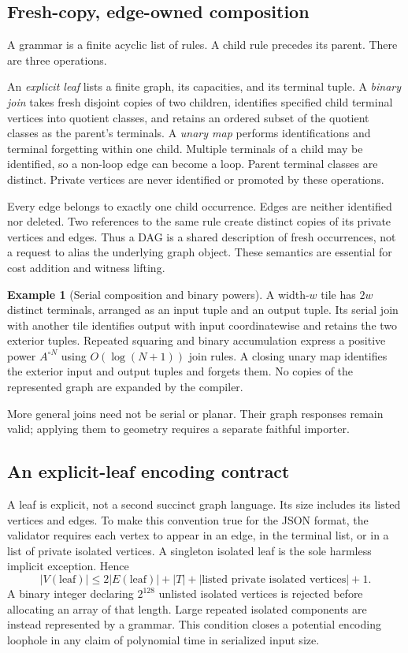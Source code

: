 \documentclass[11pt,a4paper]{article}
\theoremstyle{definition}
\newtheorem{example}[theorem]{Example}
\theoremstyle{remark}
\begin{document}
\subsection{Fresh-copy, edge-owned composition}
A grammar is a finite acyclic list of rules. A child rule precedes its parent. There are three operations.

An \emph{explicit leaf} lists a finite graph, its capacities, and its terminal tuple. A \emph{binary join} takes fresh disjoint copies of two children, identifies specified child terminal vertices into quotient classes, and retains an ordered subset of the quotient classes as the parent's terminals. A \emph{unary map} performs identifications and terminal forgetting within one child. Multiple terminals of a child may be identified, so a non-loop edge can become a loop. Parent terminal classes are distinct. Private vertices are never identified or promoted by these operations.

Every edge belongs to exactly one child occurrence. Edges are neither identified nor deleted. Two references to the same rule create distinct copies of its private vertices and edges. Thus a DAG is a shared description of fresh occurrences, not a request to alias the underlying graph object. These semantics are essential for cost addition and witness lifting.

\begin{example}[Serial composition and binary powers]
A width-$w$ tile has $2w$ distinct terminals, arranged as an input tuple and an output tuple. Its serial join with another tile identifies output with input coordinatewise and retains the two exterior tuples. Repeated squaring and binary accumulation express a positive power $A^{\circ N}$ using $O(\log(N+1))$ join rules. A closing unary map identifies the exterior input and output tuples and forgets them. No copies of the represented graph are expanded by the compiler.
\end{example}
More general joins need not be serial or planar. Their graph responses remain valid; applying them to geometry requires a separate faithful importer.

\subsection{An explicit-leaf encoding contract}
A leaf is explicit, not a second succinct graph language. Its size includes its listed vertices and edges. To make this convention true for the JSON format, the validator requires each vertex to appear in an edge, in the terminal list, or in a list of private isolated vertices. A singleton isolated leaf is the sole harmless implicit exception. Hence
\[
 |V(\text{leaf})|\le 2|E(\text{leaf})|+|T|+
 |\text{listed private isolated vertices}|+1.
\]
A binary integer declaring $2^{128}$ unlisted isolated vertices is rejected before allocating an array of that length. Large repeated isolated components are instead represented by a grammar. This condition closes a potential encoding loophole in any claim of polynomial time in serialized input size.
\end{document}
